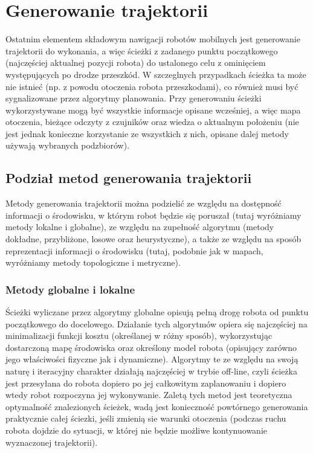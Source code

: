 \section{Generowanie trajektorii}

Ostatnim elementem składowym nawigacji robotów mobilnych jest generowanie trajektorii
do wykonania, a więc ścieżki z zadanego punktu początkowego (najczęściej aktualnej
pozycji robota) do ustalonego celu z ominięciem występujących po drodze przeszkód.
W szczeglnych przypadkach ścieżka ta może nie istnieć (np. z powodu otoczenia robota
przeszkodami), co również musi być sygnalizowane przez algorytmy planowania.
Przy generowaniu ścieżki wykorzystywane mogą być wszystkie informacje opisane wcześniej,
a więc mapa otoczenia, bieżące odczyty z czujników oraz wiedza o aktualnym położeniu
(nie jest jednak konieczne korzystanie ze wszystkich z nich, opisane dalej metody
używają wybranych podzbiorów).

\subsection{Podział metod generowania trajektorii}

Metody generowania trajektorii można podzielić ze względu na dostępność informacji
o środowisku, w którym robot będzie się poruszał (tutaj wyróżniamy metody lokalne
i globalne), ze względu na zupełność algorytmu (metody dokładne, przybliżone, losowe
oraz heurystyczne), a także ze względu na sposób reprezentacji informacji o środowisku
(tutaj, podobnie jak w mapach, wyróżniamy metody topologiczne i metryczne).

\subsubsection{Metody globalne i lokalne}

Ścieżki wyliczane przez algorytmy globalne opisują pełną drogę robota od punktu początkowego
do docelowego. Działanie tych algorytmów opiera się najczęściej na minimalizacji
funkcji kosztu (określanej w różny sposób), wykorzystując dostarczoną mapę środowiska
oraz określony model robota (opisujący zarówno jego właściwości fizyczne jak i dynamiczne).
Algorytmy te ze względu na swoją naturę i iteracyjny charakter działają najczęściej
w trybie off-line, czyli ścieżka jest przesyłana do robota dopiero po jej całkowitym
zaplanowaniu i dopiero wtedy robot rozpoczyna jej wykonywanie. Zaletą tych metod
jest teoretyczna optymalność znalezionych ścieżek, wadą jest konieczność powtórnego generowania
praktycznie całej ściezki, jeśli zmienią sie warunki otoczenia (podczas ruchu robota
dojdzie do sytuacji, w której nie będzie możliwe kontynuowanie wyznaczonej trajektorii).

